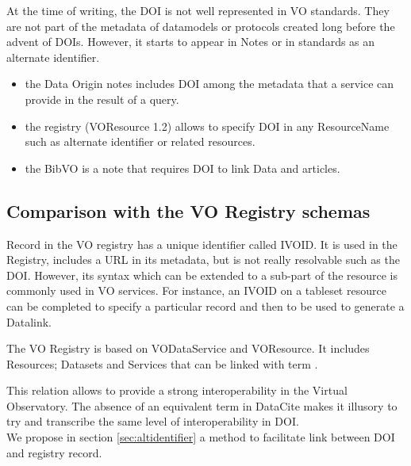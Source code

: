 \documentclass[11pt,a4paper]{ivoa}
\newcommand{\dataciteterm}[1]{\colorbox{lightgray}{DataCite:\textbf{#1}}}
\begin{document}
At the time of writing, the DOI is not well represented in VO standards. They are not part of the metadata of datamodels or protocols created long before the advent of DOIs.
However, it starts to appear in Notes or in standards as an alternate identifier.


\begin {itemize}
\item the Data Origin \citep{note:dataorigin} notes includes DOI among the metadata that a service can provide in the result of a query.
\item the registry \citep{std:registry} (VOResource 1.2) allows to specify DOI in any ResourceName such as alternate identifier or related resources.
\item the BibVO \citep{note:bibvo} is a note that requires DOI to link Data and articles.
\end{itemize}


\subsection{Comparison with the VO Registry schemas}
 Record in the VO registry has a unique identifier called IVOID. It is used in the Registry, includes a URL in its metadata, but is not really resolvable such as the DOI. However, its syntax which can be extended to a sub-part of the resource is commonly used in VO services. For instance, an IVOID on a tableset resource can be completed to specify a particular record and then to be used to generate a Datalink.
 
 The VO Registry is  based on VODataService and VOResource. It includes Resources; Datasets and Services that can be linked with term . 
 
 This relation allows to provide a strong interoperability in the Virtual Observatory. The absence of an equivalent term in DataCite makes it illusory to try and transcribe the same level of interoperability in DOI.\\
 
 
 
 We propose in section \ref{sec:altidentifier} a method to facilitate link between DOI and registry record.\\
 
\end{document}
